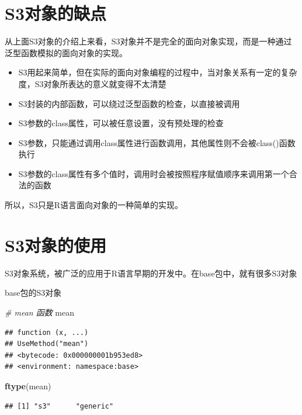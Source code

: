 \documentclass[]{book}
\newenvironment{Shaded}{\begin{snugshade}}{\end{snugshade}}
\newcommand{\KeywordTok}[1]{\textcolor[rgb]{0.13,0.29,0.53}{\textbf{#1}}}
\newcommand{\CommentTok}[1]{\textcolor[rgb]{0.56,0.35,0.01}{\textit{#1}}}
\newcommand{\NormalTok}[1]{#1}
\begin{document}
\section{S3对象的缺点}\label{s3}

从上面S3对象的介绍上来看，S3对象并不是完全的面向对象实现，而是一种通过泛型函数模拟的面向对象的实现。

\begin{itemize}
\item
  S3用起来简单，但在实际的面向对象编程的过程中，当对象关系有一定的复杂度，S3对象所表达的意义就变得不太清楚
\item
  S3封装的内部函数，可以绕过泛型函数的检查，以直接被调用
\item
  S3参数的class属性，可以被任意设置，没有预处理的检查
\item
  S3参数，只能通过调用class属性进行函数调用，其他属性则不会被class()函数执行
\item
  S3参数的class属性有多个值时，调用时会被按照程序赋值顺序来调用第一个合法的函数
\end{itemize}

所以，S3只是R语言面向对象的一种简单的实现。

\section{S3对象的使用}\label{s3}

S3对象系统，被广泛的应用于R语言早期的开发中。在base包中，就有很多S3对象

base包的S3对象

\begin{Shaded}
\begin{Highlighting}[]
\CommentTok{# mean 函数}
\NormalTok{mean}
\end{Highlighting}
\end{Shaded}

\begin{verbatim}
## function (x, ...) 
## UseMethod("mean")
## <bytecode: 0x000000001b953ed8>
## <environment: namespace:base>
\end{verbatim}

\begin{Shaded}
\begin{Highlighting}[]
\KeywordTok{ftype}\NormalTok{(mean)}
\end{Highlighting}
\end{Shaded}

\begin{verbatim}
## [1] "s3"      "generic"
\end{verbatim}
\end{document}
